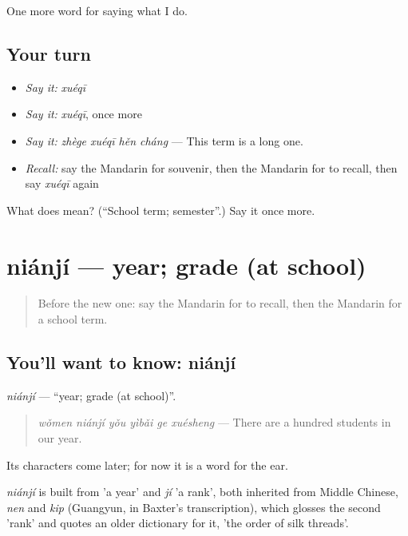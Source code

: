 \begin{grammarlens}[title={What you've built}]
One more word for saying what I do.
\end{grammarlens}

\subsection*{Your turn}
\begin{itemize}
\raggedright
  \item \emph{Say it:} \emph{xuéqī}
  \item \emph{Say it:} \emph{xuéqī}, once more
  \item \emph{Say it:} \emph{zhège xuéqī hěn cháng} — This term is a long one.
  \item \emph{Recall:} say the Mandarin for souvenir, then the Mandarin for to recall, then say \emph{xuéqī} again
\end{itemize}

\begin{tcolorbox}[breakable,colback=teal!4,colframe=teal!35!black,title={Before you move on}]
What does  mean? (\textquotedblleft{}School term; semester\textquotedblright{}.) Say it once more.
\end{tcolorbox}
\section[niánjí]{niánjí — year; grade (at school)}

\label{lesson:ZH-C248-nianji}



\begin{quote}
Before the new one: say the Mandarin for to recall, then the Mandarin for a school term.
\end{quote}

\subsection*{You'll want to know: niánjí}
\emph{niánjí} — \textquotedblleft{}year; grade (at school)\textquotedblright{}.

\begin{quote}
\emph{wǒmen niánjí yǒu yìbǎi ge xuésheng} — There are a hundred students in our year.
\end{quote}

Its characters come later; for now it is a word for the ear.

\begin{cousinweb}
\emph{niánjí} is built from  'a year' and \emph{jí} 'a rank', both inherited from Middle Chinese, \emph{nen} and \emph{kip} (Guangyun, in Baxter's transcription), which glosses the second 'rank' and quotes an older dictionary for it, 'the order of silk threads'.
\end{cousinweb}

